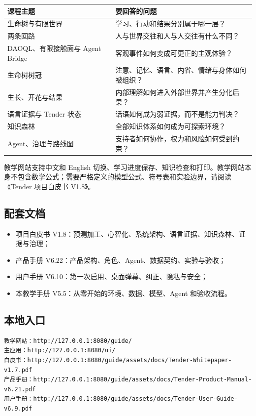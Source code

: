 \documentclass[UTF8,a4paper,11pt]{ctexart}
\begin{document}
\begin{center}
\begin{longtable}{@{}p{3.6cm}p{8.0cm}@{}}
\toprule
\textbf{课程主题} & \textbf{要回答的问题} \\
\midrule
生命树与有限世界 & 学习、行动和结果分别属于哪一层？ \\
两条回路 & 人与世界交往和人与人交往有什么不同？ \\
DAOQL、有限接触面与 Agent Bridge & 客观事件如何变成可更正的主观体验？ \\
生命树树冠 & 注意、记忆、语言、内省、情绪与身体如何被组织？ \\
生长、开花与结果 & 内部理解如何进入外部世界并产生分化后果？ \\
语言证据与 Tender 状态 & 话语如何成为弱证据，而不是能力判决？ \\
知识森林 & 全部知识体系如何成为可探索环境？ \\
Agent、治理与路线图 & 支持者如何协作，权力和风险如何受到约束？ \\
\bottomrule
\end{longtable}
\end{center}

教学网站支持中文和 English 切换、学习进度保存、知识检查和打印。教学网站本身不包含数学公式；需要严格定义的模型公式、符号表和实验边界，请阅读《Tender 项目白皮书 V1.8》。

\subsection{配套文档}

\begin{itemize}
\item 项目白皮书 V1.8：预测加工、心智化、系统架构、语言证据、知识森林、证据与治理；
\item 产品手册 V6.22：产品架构、角色、Agent、数据契约、实验与验收；
\item 用户手册 V6.10：第一次启用、桌面弹幕、纠正、隐私与安全；
\item 本教学手册 V5.5：从零开始的环境、数据、模型、Agent 和验收流程。
\end{itemize}

\subsection{本地入口}

\begin{verbatim}
教学网站：http://127.0.0.1:8080/guide/
主应用：http://127.0.0.1:8080/ui/
白皮书：http://127.0.0.1:8080/guide/assets/docs/Tender-Whitepaper-v1.7.pdf
产品手册：http://127.0.0.1:8080/guide/assets/docs/Tender-Product-Manual-v6.21.pdf
用户手册：http://127.0.0.1:8080/guide/assets/docs/Tender-User-Guide-v6.9.pdf
\end{verbatim}
\end{document}
